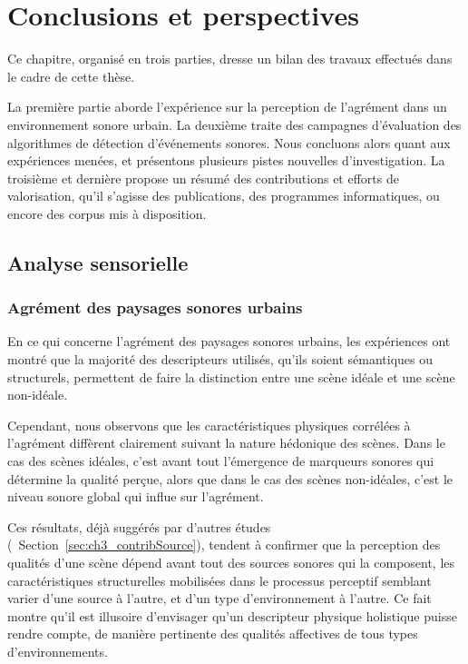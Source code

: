 \chapter{Conclusions et perspectives}\label{ch:end_conc}

Ce chapitre, organisé en trois parties, dresse un bilan des travaux effectués dans le cadre de cette thèse.

La première partie aborde l'expérience sur la perception de l'agrément dans un environnement sonore urbain. La deuxième traite des campagnes d'évaluation des algorithmes de détection d'événements sonores. Nous concluons alors quant aux expériences menées, et présentons plusieurs pistes nouvelles d'investigation. La troisième et dernière propose un résumé des contributions et efforts de valorisation, qu'il s'agisse des publications, des programmes informatiques, ou encore des corpus mis à disposition.

\section{Analyse sensorielle}

\subsection{Agrément des paysages sonores urbains}

En ce qui concerne l'agrément des paysages sonores urbains, les expériences ont montré que la majorité des descripteurs utilisés, qu'ils soient sémantiques ou structurels, permettent de faire la distinction entre une scène idéale et une scène non-idéale.

Cependant, nous observons que les caractéristiques physiques corrélées à l'agrément diffèrent clairement suivant la nature hédonique des scènes. Dans le cas des scènes idéales, c'est avant tout l'émergence de marqueurs sonores qui détermine la qualité perçue, alors que dans le cas des scènes non-idéales, c'est le niveau sonore global qui influe sur l'agrément.

Ces résultats, déjà suggérés par d'autres études (\cf~Section~\ref{sec:ch3_contribSource}), tendent à confirmer que la perception des qualités d'une scène dépend avant tout des sources sonores qui la composent, les caractéristiques structurelles mobilisées dans le processus perceptif semblant varier d'une source à l'autre, et d'un type d'environnement à l'autre. Ce fait montre qu'il est illusoire d'envisager qu'un descripteur physique holistique puisse rendre compte, de manière pertinente des qualités affectives de tous types d'environnements.

